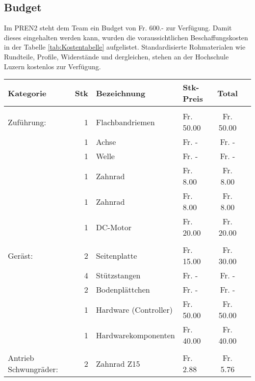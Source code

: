 \subsection{Budget}
	Im PREN2 steht dem Team ein Budget von Fr. 600.- zur Verfügung. Damit dieses eingehalten werden kann, wurden die voraussichtlichen Beschaffungskosten in der Tabelle \ref{tab:Kostentabelle} aufgelistet. Standardisierte Rohmaterialen wie Rundteile, Profile, Widerstände und dergleichen, stehen an der Hochschule Luzern kostenlos zur Verfügung.
    \begin{longtable}{p{1.7cm}rllcc}
    \textbf{Kategorie} & \textbf{Stk} & \textbf{Bezeichnung} & \textbf{Stk-Preis}
    & \textbf{Total} \\
    \hline     &       &                              &            &            \\
    Zuführung: & 1     & Flachbandriemen 	          &  Fr. 50.00 &  Fr. 50.00 \\
               & 1     & Achse          	          &  Fr. -     &  Fr. -     \\
               & 1     & Welle                     	  &  Fr. -     &  Fr. -     \\
               & 1     & Zahnrad         	          &  Fr. 8.00  &  Fr. 8.00  \\
               & 1     & Zahnrad         	          &  Fr. 8.00  &  Fr. 8.00  \\
               & 1     & DC-Motor        	          &  Fr. 20.00 &  Fr. 20.00 \\
               &       &                 	          &            &            \\
       Geräst: & 2     & Seitenplatte    	          &  Fr. 15.00 &  Fr. 30.00 \\
               & 4     & Stützstangen    	          &  Fr. -     &  Fr. -     \\
               & 2     & Bodenplättchen  	          &  Fr. -     &  Fr. -     \\
               & 1     & Hardware (Controller)        &  Fr. 50.00 &  Fr. 50.00 \\
               & 1     & Hardwarekomponenten          &  Fr. 40.00 &  Fr. 40.00 \\
               &       &       				          &      	   &            \\
   \multirow{3}{1.7cm}{Antrieb Schwungräder:}  
               & 2     & Zahnrad Z15                  &  Fr. 2.88  &  Fr. 5.76  \\

\end{longtable}
